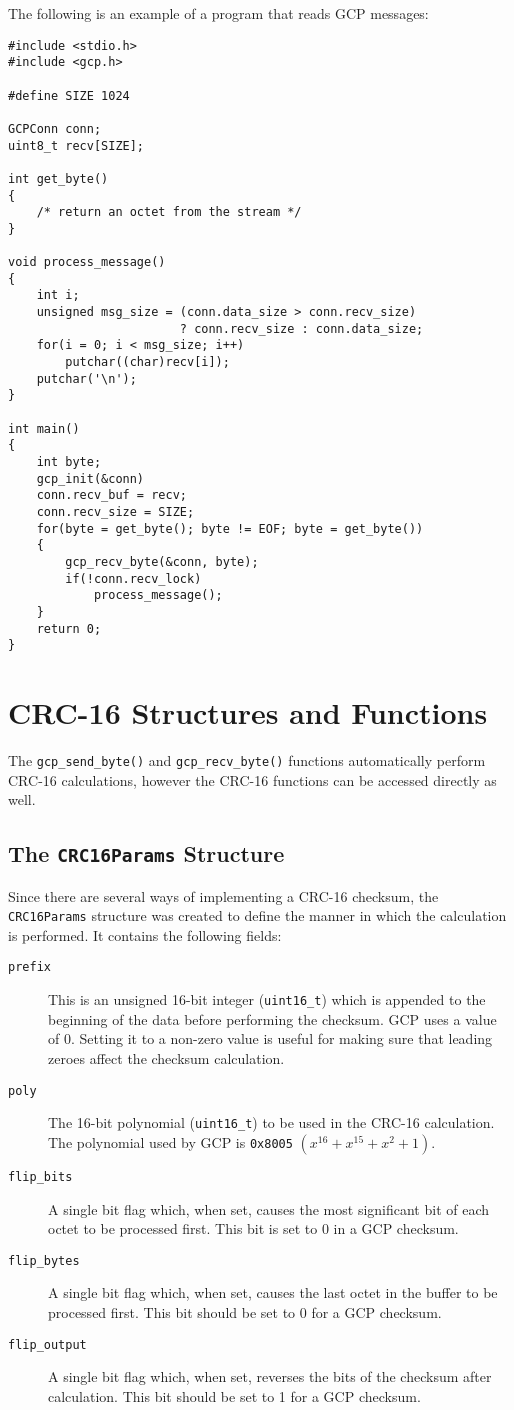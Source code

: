\documentclass{article}
\begin{document}
The following is an example of a program that reads GCP messages:
\begin{verbatim}
#include <stdio.h>
#include <gcp.h>

#define SIZE 1024

GCPConn conn;
uint8_t recv[SIZE];

int get_byte()
{
    /* return an octet from the stream */
}

void process_message()
{
    int i;
    unsigned msg_size = (conn.data_size > conn.recv_size)
                        ? conn.recv_size : conn.data_size;
    for(i = 0; i < msg_size; i++)
        putchar((char)recv[i]);
    putchar('\n');    
}

int main()
{
    int byte;
    gcp_init(&conn)
    conn.recv_buf = recv;
    conn.recv_size = SIZE;
    for(byte = get_byte(); byte != EOF; byte = get_byte())
    {
        gcp_recv_byte(&conn, byte);
        if(!conn.recv_lock)
            process_message();
    }
    return 0;
}
\end{verbatim}

\section{CRC-16 Structures and Functions}
The \texttt{gcp\_send\_byte()} and \texttt{gcp\_recv\_byte()}
functions automatically perform CRC-16 calculations, however the
CRC-16 functions can be accessed directly as well.

\subsection{The \texttt{CRC16Params} Structure}
\label{sec:crc-params}
Since there are several ways of implementing a CRC-16 checksum, the
\texttt{CRC16Params} structure was created to define the manner in
which the calculation is performed.  It contains the following fields:
\begin{description}
\item[\texttt{prefix}]This is an unsigned 16-bit integer
  (\texttt{uint16\_t}) which is appended to the beginning of the data
  before performing the checksum.  GCP uses a value of 0.  Setting it
  to a non-zero value is useful for making sure that leading zeroes
  affect the checksum calculation.
\item[\texttt{poly}]The 16-bit polynomial (\texttt{uint16\_t}) to be
  used in the CRC-16 calculation.  The polynomial used by GCP is
  \texttt{0x8005} $(x^{16} + x^{15} + x^2 + 1)$.
\item[\texttt{flip\_bits}]A single bit flag which, when set, causes
  the most significant bit of each octet to be processed first.  This
  bit is set to 0 in a GCP checksum.
\item[\texttt{flip\_bytes}]A single bit flag which, when set, causes
  the last octet in the buffer to be processed first.  This bit should
  be set to 0 for a GCP checksum.
\item[\texttt{flip\_output}]A single bit flag which, when set,
  reverses the bits of the checksum after calculation.  This bit
  should be set to 1 for a GCP checksum.
\end{description}
\end{document}
